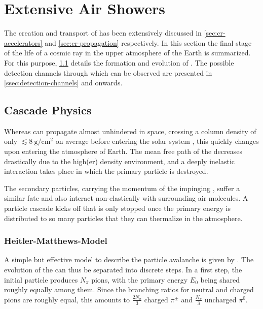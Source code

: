 \section{Extensive Air Showers}
\label{sec:extensive-air-showers}

The creation and transport of \CRs has been extensively discussed in
\cref{sec:cr-accelerators} and \cref{sec:cr-propagation} respectively. In this
section the final stage of the life of a cosmic ray in the upper atmosphere of 
the Earth is summarized. For this purpose, \cref{ssec:cascade-model} details
the formation and evolution of \EASs. The possible detection channels through
which \EASs can be observed are presented in \cref{ssec:detection-channels} and
onwards.

\subsection{Cascade Physics}
\label{ssec:cascade-model}

Whereas \CRs can propagate almost unhindered in space, crossing a column 
density of only $\lesssim\SI{8}{\gram\per\centi\meter\squared}$ on average
before entering the solar system \cite{gaisserCosmicRaysParticle2016}, this 
quickly changes upon entering the atmosphere of Earth. The mean free path of 
the \CR decreases drastically due to the high(er) density environment, and a 
deeply inelastic interaction takes place in which the primary particle is 
destroyed. 

The \UHE secondary particles, carrying the momentum of the impinging \CR, 
suffer a similar fate and also interact non-elastically with surrounding air 
molecules. A particle cascade kicks off that is only stopped once the primary 
energy is distributed to so many particles that they can thermalize in the
atmosphere.

\subsubsection{Heitler-Matthews-Model}
\label{sssec:heitler-matthews-model}

A simple but effective model to describe the particle avalanche is given by
\cite{matthewsHeitlerModelExtensive2005}. The evolution of the \EAS can thus be
separated into discrete steps. In a first step, the initial particle produces
$N_\pi$ pions, with the primary energy $E_0$ being shared roughly equally among
them. Since the branching ratios for neutral and charged pions are roughly 
equal, this amounts to $\frac{2N_\pi}{3}$ charged $\pi^\pm$ and 
$\frac{N_\pi}{3}$ uncharged $\pi^0$. 

